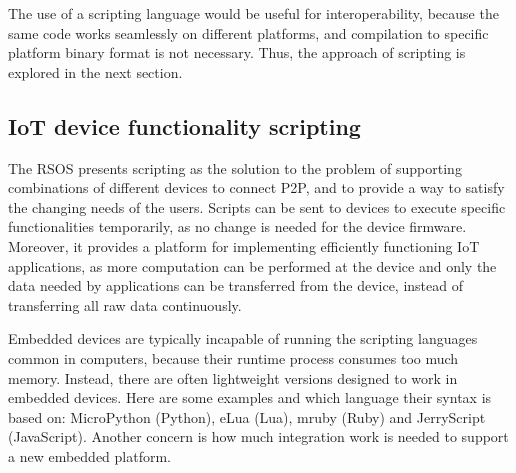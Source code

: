 The use of a scripting language would be useful for interoperability, because the same code works seamlessly on different platforms, and compilation to specific platform binary format is not necessary. Thus, the approach of scripting is explored in the next section.





\subsection{IoT device functionality scripting}


The RSOS presents scripting as the solution to the problem of supporting combinations of different devices to connect P2P, and to provide a way to satisfy the changing needs of the users. Scripts can be sent to devices to execute specific functionalities temporarily, as no change is needed for the device firmware. Moreover, it provides a platform for implementing efficiently functioning IoT applications, as more computation can be performed at the device and only the data needed by applications can be transferred from the device, instead of transferring all raw data continuously.

Embedded devices are typically incapable of running the scripting languages common in computers, because their runtime process consumes too much memory. Instead, there are often lightweight versions designed to work in embedded devices. Here are some examples and which language their syntax is based on: MicroPython (Python), eLua (Lua), mruby (Ruby) and JerryScript (JavaScript). Another concern is how much integration work is needed to support a new embedded platform.

